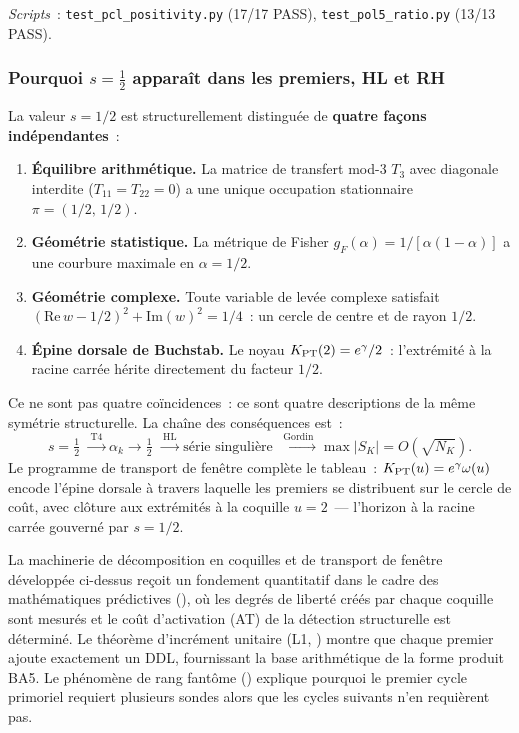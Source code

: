 \documentclass[12pt,a4paper]{article}
\begin{document}
\noindent
\textit{Scripts}~:
\texttt{test\_pcl\_positivity.py} (17/17 PASS),
\texttt{test\_pol5\_ratio.py} (13/13 PASS).

\subsubsection{Pourquoi $s = \tfrac{1}{2}$ apparaît dans les premiers, HL et RH}
\label{sec:ch9_s_half}

La valeur $s = 1/2$ est structurellement distinguée de
\textbf{quatre façons indépendantes}~:
\begin{enumerate}[nosep]
\item \textbf{Équilibre arithmétique.} La matrice de transfert
  mod-3 $T_3$ avec diagonale interdite ($T_{11} = T_{22} = 0$) a
  une unique occupation stationnaire $\pi = (1/2,\,1/2)$.
\item \textbf{Géométrie statistique.} La métrique de Fisher
  $g_F(\alpha) = 1/[\alpha(1-\alpha)]$ a une courbure maximale en
  $\alpha = 1/2$.
\item \textbf{Géométrie complexe.} Toute variable de levée
  complexe satisfait
  $(\mathrm{Re}\,w - 1/2)^2 + \mathrm{Im}(w)^2 = 1/4$~: un cercle
  de centre et de rayon $1/2$.
\item \textbf{Épine dorsale de Buchstab.} Le noyau
  $K_{\rm PT}(2) = e^\gamma/2$~: l'extrémité à la racine carrée
  hérite directement du facteur $1/2$.
\end{enumerate}

Ce ne sont pas quatre coïncidences~: ce sont quatre descriptions
de la même symétrie structurelle. La chaîne des conséquences est~:
\begin{equation}
  s = \tfrac{1}{2}
  \;\xrightarrow{\;\text{T4}\;}
  \alpha_k \to \tfrac{1}{2}
  \;\xrightarrow{\;\text{HL}\;}
  \text{série singulière}
  \;\xrightarrow{\;\text{Gordin}\;}
  \max|S_K| = O(\sqrt{N_K}).
  \label{eq:s_half_chain}
\end{equation}
Le programme de transport de fenêtre complète le tableau~:
$K_{\rm PT}(u) = e^\gamma\omega(u)$ encode l'épine dorsale à
travers laquelle les premiers se distribuent sur le cercle de
coût, avec clôture aux extrémités à la coquille $u = 2$~--- l'horizon
à la racine carrée gouverné par $s = 1/2$.

\begin{remarque}\mBR
\label{rem:PM_bridge}
La machinerie de décomposition en coquilles et de transport de
fenêtre développée ci-dessus reçoit un fondement quantitatif dans
le cadre des mathématiques prédictives (\cite{companion_M4}), où
les degrés de liberté créés par chaque coquille sont mesurés et
le coût d'activation (AT) de la détection structurelle est
déterminé. Le théorème d'incrément unitaire (L1,
\cite{companion_M4}) montre que chaque premier ajoute exactement
un DDL, fournissant la base arithmétique de la forme produit BA5.
Le phénomène de rang fantôme (\cite{companion_M4}) explique
pourquoi le premier cycle primoriel requiert plusieurs sondes
alors que les cycles suivants n'en requièrent pas.
\end{remarque}
\end{document}
